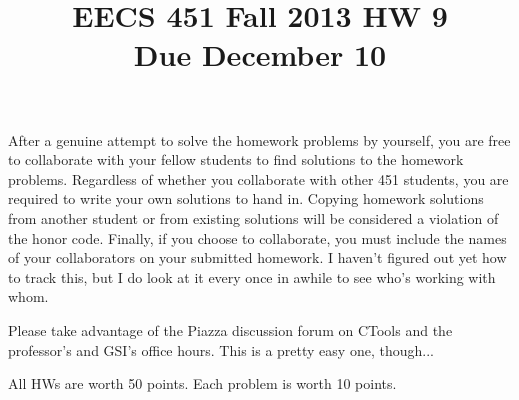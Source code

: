 \documentclass[]{siamltex}
\title{EECS 451 Fall 2013 HW 9 \\
 \hspace{1.2cm} Due December 10}
\date{}
\begin{document}
%
\maketitle

After a genuine attempt to solve the homework problems by yourself, you are free to collaborate with your fellow students to find solutions to the homework problems. Regardless of whether you collaborate with other 451 students, you are required to write your own solutions to hand in. Copying homework solutions from another student or from existing solutions will be considered a violation of the honor code. Finally, if you choose to collaborate, you must include the names of your collaborators on your submitted homework. I haven't figured out yet how to track this, but I do look at it every once in awhile to see who's working with whom.

\vspace{2mm} 

Please take advantage of the Piazza discussion forum on CTools and the professor's and GSI's office hours. This is a pretty easy one, though...

\vspace{2mm}
All HWs are worth 50 points. Each problem is worth 10 points.

\vspace{5mm}
\end{document}
